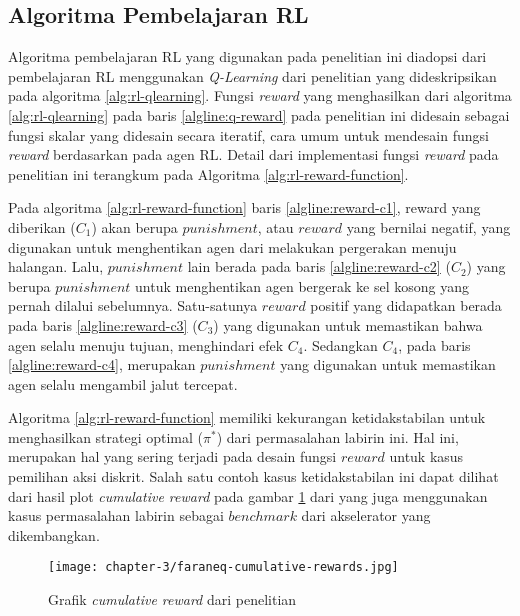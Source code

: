\subsection{Algoritma Pembelajaran \acl{RL}}
\label{sec:sub-pembelajaran-rl}

Algoritma pembelajaran \ac{RL} yang digunakan pada penelitian ini diadopsi dari pembelajaran \ac{RL} menggunakan \textit{Q-Learning} dari penelitian \parencite{sutisna2023faraneq} yang dideskripsikan pada algoritma \ref{alg:rl-qlearning}. Fungsi \textit{reward} yang menghasilkan dari algoritma \ref{alg:rl-qlearning} pada baris \ref{algline:q-reward} pada penelitian ini didesain sebagai fungsi skalar yang didesain secara iteratif, cara umum untuk mendesain fungsi \textit{reward} berdasarkan \parencite{hayes2022practical} pada agen \ac{RL}. Detail dari implementasi fungsi \textit{reward} pada penelitian ini terangkum pada Algoritma \ref{alg:rl-reward-function}.

Pada algoritma \ref{alg:rl-reward-function} baris \ref{algline:reward-c1}, reward yang diberikan ($C_1$) akan berupa $punishment$, atau $reward$ yang bernilai negatif, yang digunakan untuk menghentikan agen dari melakukan pergerakan menuju halangan. Lalu, $punishment$ lain berada pada baris \ref{algline:reward-c2} ($C_2$) yang berupa $punishment$ untuk menghentikan agen bergerak ke sel kosong yang pernah dilalui sebelumnya. Satu-satunya $reward$ positif yang didapatkan berada pada baris \ref{algline:reward-c3} ($C_3$) yang digunakan untuk memastikan bahwa agen selalu menuju tujuan, menghindari efek $C_4$. Sedangkan $C_4$, pada baris \ref{algline:reward-c4}, merupakan $punishment$ yang digunakan untuk memastikan agen selalu mengambil jalut tercepat.

Algoritma \ref{alg:rl-reward-function} memiliki kekurangan ketidakstabilan untuk menghasilkan strategi optimal ($\pi^*$) dari permasalahan labirin ini. Hal ini, merupakan hal yang sering terjadi pada desain fungsi $reward$ untuk kasus pemilihan aksi diskrit. Salah satu contoh kasus ketidakstabilan ini dapat dilihat dari hasil plot \textit{cumulative reward} pada gambar \ref{fig:cumulative-reward-faraneq} dari \parencite{sutisna2023faraneq} yang juga menggunakan kasus permasalahan labirin sebagai $benchmark$ dari akselerator yang dikembangkan.

\begin{figure}[H]
	\centering
	\texttt{[image: chapter-3/faraneq-cumulative-rewards.jpg]}
	\caption{Grafik \textit{cumulative reward} dari penelitian \parencite{sutisna2023faraneq}}
	\label{fig:cumulative-reward-faraneq}
\end{figure}


